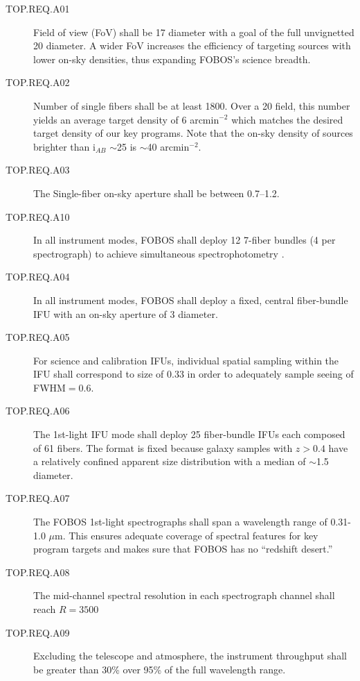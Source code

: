 \documentclass[11pt,a4paper,twoside,onecolumn,openany,final,oldfontcommands]{memoir}
\begin{document}
\begin{description}

\item [TOP.REQ.A01] Field of view (FoV) shall be 17\arcmin{} diameter with a goal of the full unvignetted 20\arcmin{} diameter.  A wider FoV increases the efficiency of targeting sources with lower on-sky densities, thus expanding FOBOS's science breadth.

\item [TOP.REQ.A02] Number of single fibers shall be at least 1800.  Over a 20\arcmin{} field, this number yields an average target density of 6 arcmin$^{-2}$ which matches the desired target density of our key programs.  Note that the on-sky density of sources brighter than i$_{AB}$ $\sim$25 is $\sim$40 arcmin$^{-2}$.

\item [TOP.REQ.A03] The Single-fiber on-sky aperture shall be between 0.7--1.2\arcsec{}.

\item [TOP.REQ.A10] In all instrument modes, FOBOS shall deploy 12 7-fiber bundles (4 per spectrograph) to achieve simultaneous spectrophotometry \citep[see][]{yan16}.  

\item [TOP.REQ.A04] In all instrument modes, FOBOS shall deploy a fixed, central fiber-bundle IFU with an on-sky aperture of 3\arcsec{} diameter.

\item [TOP.REQ.A05] For science and calibration IFUs, individual spatial sampling within the IFU shall correspond to size of 0.33\arcsec{} in order to adequately sample seeing of FWHM$ = 0.6$\arcsec.

\item [TOP.REQ.A06] The 1st-light IFU mode shall deploy 25 fiber-bundle IFUs each composed of 61 fibers.  The format is fixed because galaxy samples with $z > 0.4$ have a relatively confined apparent size distribution with a median of  $\sim$1.5\arcsec{} diameter.

\item [TOP.REQ.A07] The FOBOS 1st-light spectrographs shall span a wavelength range of 0.31-1.0 $\mu$m.  This ensures adequate coverage of spectral features for key program targets and makes sure that FOBOS has no ``redshift desert.''

\item [TOP.REQ.A08] The mid-channel spectral resolution in each spectrograph channel shall reach $R = 3500$

\item [TOP.REQ.A09] Excluding the telescope and atmosphere, the instrument throughput shall be greater than 30\% over 95\% of the full wavelength range.

\end{description}
\end{document}
